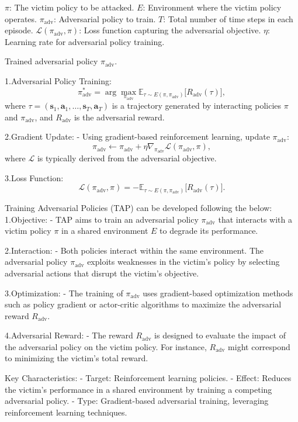 $\pi$: The victim policy to be attacked.
$E$: Environment where the victim policy operates.
$\pi_{\text{adv}}$: Adversarial policy to train.
$T$: Total number of time steps in each episode.
$\mathcal{L}(\pi_{\text{adv}}, \pi)$: Loss function capturing the adversarial objective.
$\eta$: Learning rate for adversarial policy training.

Trained adversarial policy $\pi_{\text{adv}}$.

1.Adversarial Policy Training:
   \[
   \pi_{\text{adv}}^* = \arg \max_{\pi_{\text{adv}}} \mathbb{E}_{\tau \sim E(\pi, \pi_{\text{adv}})} \Big[ R_{\text{adv}}(\tau) \Big],
   \]
   where $\tau = (\mathbf{s}_1, \mathbf{a}_1, \dots, \mathbf{s}_T, \mathbf{a}_T)$ is a trajectory generated by interacting policies $\pi$ and $\pi_{\text{adv}}$, and $R_{\text{adv}}$ is the adversarial reward.

2.Gradient Update:
   - Using gradient-based reinforcement learning, update $\pi_{\text{adv}}$:
     \[
     \pi_{\text{adv}} \leftarrow \pi_{\text{adv}} + \eta \nabla_{\pi_{\text{adv}}} \mathcal{L}(\pi_{\text{adv}}, \pi),
     \]
     where $\mathcal{L}$ is typically derived from the adversarial objective.

3.Loss Function:
   \[
   \mathcal{L}(\pi_{\text{adv}}, \pi) = -\mathbb{E}_{\tau \sim E(\pi, \pi_{\text{adv}})} \Big[ R_{\text{adv}}(\tau) \Big].
   \]

Training Adversarial Policies (TAP) can be developed following the below:
1.Objective:
   - TAP aims to train an adversarial policy $\pi_{\text{adv}}$ that interacts with a victim policy $\pi$ in a shared environment $E$ to degrade its performance.

2.Interaction:
   - Both policies interact within the same environment. The adversarial policy $\pi_{\text{adv}}$ exploits weaknesses in the victim's policy by selecting adversarial actions that disrupt the victim's objective.

3.Optimization:
   - The training of $\pi_{\text{adv}}$ uses gradient-based optimization methods such as policy gradient or actor-critic algorithms to maximize the adversarial reward $R_{\text{adv}}$.

4.Adversarial Reward:
   - The reward $R_{\text{adv}}$ is designed to evaluate the impact of the adversarial policy on the victim policy. For instance, $R_{\text{adv}}$ might correspond to minimizing the victim's total reward.

Key Characteristics:
- Target: Reinforcement learning policies.
- Effect: Reduces the victim's performance in a shared environment by training a competing adversarial policy.
- Type: Gradient-based adversarial training, leveraging reinforcement learning techniques.

